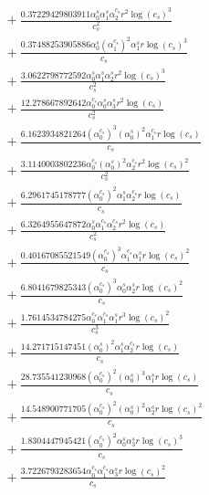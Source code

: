 \documentclass[10pt]{article}
\begin{document}
\begin{align*}
&{}  + \frac{0.37229429803911 \alpha_{0}^s \alpha_{1}^s \alpha_{2}^{c_s} r^{2} \log{\left(c_{s} \right)}^{3}}{c_{s}^{2}} \\
&{}  + \frac{0.37488253905886 \alpha_{0}^s \left(\alpha_{1}^{c_s}\right)^{2} \alpha_{1}^s r \log{\left(c_{s} \right)}^{3}}{c_{s}} \\
&{}  + \frac{3.0622798772592 \alpha_{0}^s \alpha_{1}^s \alpha_{2}^s r^{2} \log{\left(c_{s} \right)}^{3}}{c_{s}^{2}} \\
&{}  + \frac{12.278667892642 \alpha_{0}^{c_s} \alpha_{0}^s \alpha_{3}^s r^{2} \log{\left(c_{s} \right)}}{c_{s}^{2}} \\
&{}  + \frac{6.1623934821264 \left(\alpha_{0}^{c_s}\right)^{3} \left(\alpha_{0}^s\right)^{2} \alpha_{1}^{c_s} r \log{\left(c_{s} \right)}}{c_{s}} \\
&{}  + \frac{3.1140003802236 \alpha_{0}^{c_s} \left(\alpha_{0}^s\right)^{2} \alpha_{2}^{c_s} r^{2} \log{\left(c_{s} \right)}^{2}}{c_{s}^{2}} \\
&{}  + \frac{6.2961745178777 \left(\alpha_{0}^{c_s}\right)^{2} \alpha_{1}^s \alpha_{2}^{c_s} r \log{\left(c_{s} \right)}}{c_{s}} \\
&{}  + \frac{6.3264955647872 \alpha_{0}^s \alpha_{1}^{c_s} \alpha_{2}^{c_s} r^{2} \log{\left(c_{s} \right)}}{c_{s}^{2}} \\
&{}  + \frac{0.40167085521549 \left(\alpha_{0}^{c_s}\right)^{3} \alpha_{1}^{c_s} \alpha_{1}^s r \log{\left(c_{s} \right)}^{2}}{c_{s}} \\
&{}  + \frac{6.8041679825343 \left(\alpha_{0}^{c_s}\right)^{3} \alpha_{0}^s \alpha_{2}^s r \log{\left(c_{s} \right)}^{2}}{c_{s}} \\
&{}  + \frac{1.7614534784275 \alpha_{0}^{c_s} \alpha_{1}^{c_s} \alpha_{1}^s r^{3} \log{\left(c_{s} \right)}^{2}}{c_{s}^{3}} \\
&{}  + \frac{14.271715147451 \left(\alpha_{0}^s\right)^{2} \alpha_{1}^s \alpha_{2}^{c_s} r \log{\left(c_{s} \right)}}{c_{s}} \\
&{}  + \frac{28.735541230968 \left(\alpha_{0}^{c_s}\right)^{2} \left(\alpha_{0}^s\right)^{3} \alpha_{1}^s r \log{\left(c_{s} \right)}}{c_{s}} \\
&{}  + \frac{14.548900771705 \left(\alpha_{0}^{c_s}\right)^{2} \left(\alpha_{0}^s\right)^{2} \alpha_{2}^s r \log{\left(c_{s} \right)}^{2}}{c_{s}} \\
&{}  + \frac{1.8304447945421 \left(\alpha_{0}^{c_s}\right)^{2} \alpha_{0}^s \alpha_{3}^s r \log{\left(c_{s} \right)}^{3}}{c_{s}} \\
&{}  + \frac{3.7226793283654 \alpha_{0}^{c_s} \alpha_{1}^{c_s} \alpha_{3}^s r \log{\left(c_{s} \right)}^{2}}{c_{s}} \\

\end{align*}
\end{document}
